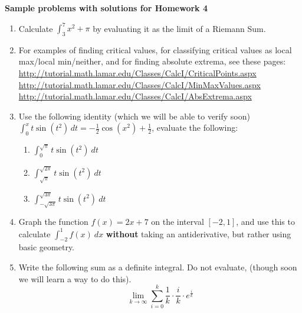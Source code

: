 \documentclass{article}
\begin{document}
\begin{center}
\textbf{
    Sample problems with solutions for Homework 4}
\end{center}
    \begin{enumerate}
\item Calculate $\int_3^7 x^2 +\pi$ by evaluating it as the limit of a Riemann Sum. 
\item For examples of finding critical values, for classifying critical values as local max/local min/neither, and for finding absolute extrema, see these pages:\\ \url{http://tutorial.math.lamar.edu/Classes/CalcI/CriticalPoints.aspx}\\
 \url{http://tutorial.math.lamar.edu/Classes/CalcI/MinMaxValues.aspx}\\
 \url{http://tutorial.math.lamar.edu/Classes/CalcI/AbsExtrema.aspx}
\item Use the following identity (which we will be able to verify soon) $\int_{0}^x t\sin(t^2) \,dt= -\frac{1}{2}\cos(x^2)+\frac{1}{2} $, evaluate the following:
\begin{enumerate}
\item $\int_0^{\sqrt{\pi}} t\sin(t^2)\ dt$ 
\item $\int_{\sqrt{\pi}}^{\sqrt{2\pi}} t\sin(t^2)\ dt$ 
\item $\int_{-\sqrt{3\pi}}^{\sqrt{3\pi}} t\sin(t^2)\ dt$ 
\end{enumerate}
\item Graph the function $f(x)=2x+7$ on the interval $[-2,1]$, and use this to calculate $\int_{-2}^1 f(x)\ dx$ {\bf without} taking an antiderivative, but rather using basic geometry.
\item Write the following sum as a definite integral.  Do not evaluate, (though soon we will learn a way to do this). 
    \[\lim_{k\rightarrow\infty} \sum_{i=0}^{k} \frac{1}{k}\cdot\frac{i}{k}\cdot e^{\frac{i}{k}}\]
    \end{enumerate}
    \newpage
    
    
    
\end{document}
